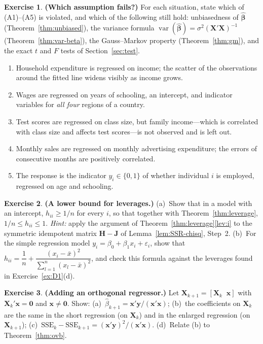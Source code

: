 \documentclass[14pt]{extarticle}
\theoremstyle{plain}
\theoremstyle{definition}
\newtheorem{exercise}{Exercise}
\theoremstyle{remark}
\DeclareMathOperator\var{var}
\newcommand{\SSE}{\mathrm{SSE}}
\newcommand{\bX}{\mathbf{X}}
\newcommand{\by}{\mathbf{y}}
\newcommand{\bx}{\mathbf{x}}
\def\bb{\boldsymbol{\beta}}
\newcommand{\bH}{\mathbf{H}}
\newcommand{\bzero}{\mathbf{0}}
\newcommand{\bJ}{\mathbf{J}}
\begin{document}
\begin{exercise}\label{ex:D2}
\textbf{(Which assumption fails?)} For each situation, state which of (A1)--(A5) is violated, and which of the following still hold: unbiasedness of $\hat{\bb}$ (Theorem~\ref{thm:unbiased}), the variance formula $\var(\hat{\bb}) = \sigma^2(\bX'\bX)^{-1}$ (Theorem~\ref{thm:var-beta}), the Gauss--Markov property (Theorem~\ref{thm:gm}), and the exact $t$ and $F$ tests of Section~\ref{sec:test}.
\begin{enumerate}[label=\textup{(\roman*)}]
\item Household expenditure is regressed on income; the scatter of the observations around the fitted line widens visibly as income grows.
\item Wages are regressed on years of schooling, an intercept, and indicator variables for \emph{all four} regions of a country.
\item Test scores are regressed on class size, but family income---which is correlated with class size and affects test scores---is not observed and is left out.
\item Monthly sales are regressed on monthly advertising expenditure; the errors of consecutive months are positively correlated.
\item The response is the indicator $y_i \in \{0, 1\}$ of whether individual $i$ is employed, regressed on age and schooling.
\end{enumerate}
\end{exercise}

\begin{exercise}\label{ex:D3}
\textbf{(A lower bound for leverages.)} (a)~Show that in a model with an intercept, $h_{ii} \geqslant 1/n$ for every $i$, so that together with Theorem~\ref{thm:leverage}, $1/n \leqslant h_{ii} \leqslant 1$. \emph{Hint:} apply the argument of Theorem~\ref{thm:leverage}\ref{lev:i} to the symmetric idempotent matrix $\bH - \bJ$ of Lemma~\ref{lem:SSR-chisq}, Step~2. (b)~For the simple regression model $y_i = \beta_0 + \beta_1 x_i + \varepsilon_i$, show that $h_{ii} = \dfrac{1}{n} + \dfrac{(x_i - \bar{x})^2}{\sum_{l=1}^n (x_l - \bar{x})^2}$, and check this formula against the leverages found in Exercise~\ref{ex:D1}(d).
\end{exercise}

\begin{exercise}\label{ex:D4}
\textbf{(Adding an orthogonal regressor.)} Let $\bX_{k+1} = [\bX_k \;\; \bx]$ with $\bX_k'\bx = \bzero$ and $\bx \neq \bzero$. Show: (a)~$\hat{\beta}_{k+1} = \bx'\by/(\bx'\bx)$; (b)~the coefficients on $\bX_k$ are the same in the short regression (on $\bX_k$) and in the enlarged regression (on $\bX_{k+1}$); (c)~$\SSE_k - \SSE_{k+1} = (\bx'\by)^2/(\bx'\bx)$. (d)~Relate (b) to Theorem~\ref{thm:ovb}.
\end{exercise}
\end{document}
